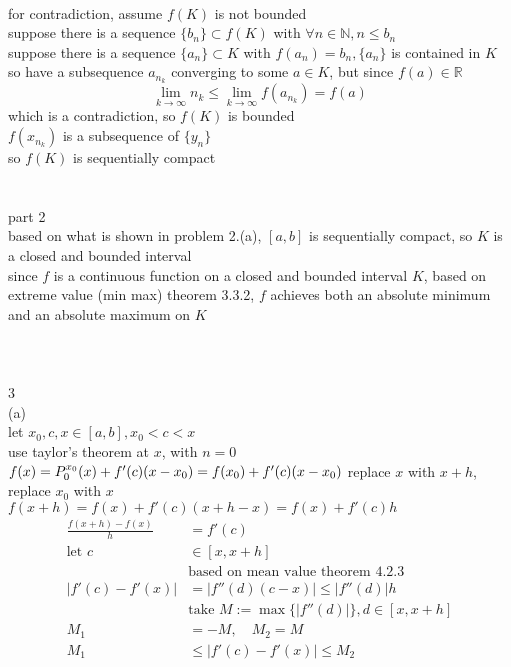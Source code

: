 \documentclass[12pt, border = 4pt, multi]{article} %
\begin{document}
\\
for contradiction, assume $f(K)$ is not bounded\\
suppose there is a sequence $\{b_n\} \subset f(K)$ with $\forall n \in \mathbb{N}, n \leq b_n$\\
suppose there is a sequence $\{a_n\} \subset K$ with $f(a_n) = b_n, \{a_n\}$ is contained in $K$ so have a subsequence $a_{n_k}$ converging to some $a \in K$, but since $f(a) \in \mathbb{R}$
\[\lim_{k \rightarrow \infty} n_k \leq \lim_{k \rightarrow \infty} f(a_{n_k}) = f(a)\]
which is a contradiction, so $f(K)$ is bounded\\
$f(x_{n_k})$ is a subsequence of $\{y_n\}$\\
so $f(K)$ is sequentially compact\\
\\
\\
part 2\\
based on what is shown in problem 2.(a), $[a, b]$ is sequentially compact, so $K$ is a closed and bounded interval\\
since $f$ is a continuous function on a closed and bounded interval $K$, based on extreme value (min max) theorem 3.3.2, $f$ achieves both an absolute minimum and an absolute maximum on $K$\\
\\
\\
\\
3\\
(a)\\
let $x_0, c, x \in [a, b], x_0 < c < x$\\
use taylor's theorem at $x$, with $n = 0$\\
$f(x) = P_0 ^ {x_0}(x) + f'(c)(x - x_0) = f(x_0) + f'(c)(x - x_0)\\$
replace $x$ with $x + h$, replace $x_0$ with $x$\\
$f(x + h) = f(x) + f'(c)(x + h - x) = f(x) + f'(c)h$
\begin{align*}
\frac{f(x + h) - f(x)}{h} &= f'(c)\\
\text{let } c &\in [x, x + h]\\
&\text{based on mean value theorem 4.2.3}\\
|f'(c) - f'(x)| &= |f''(d)(c - x)| \leq |f''(d)|h\\
&\text{take } M := \max\{|f''(d)|\}, d \in [x, x + h]\\
M_1 &= -M,\quad M_2 = M\\
M_1 &\leq |f'(c) - f'(x)| \leq M_2\\
\end{align*}
\end{document}
